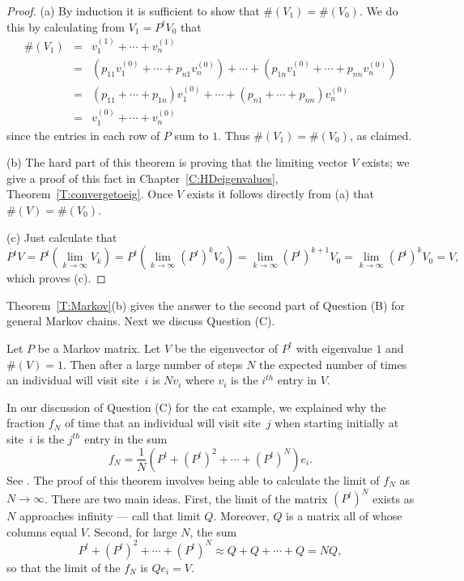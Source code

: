 \documentclass{ximera}
\begin{document}
\begin{proof}  (a) By induction it is sufficient to show that $\#(V_1)=\#(V_0)$.  We
do
this by calculating from $V_1 = P^tV_0$ that
\begin{eqnarray*}
\#(V_1) & = & v_1^{(1)} + \cdots + v_n^{(1)}\\
& = & (p_{11}v_1^{(0)} + \cdots + p_{n1}v_n^{(0)}) + \cdots +
	(p_{1n}v_1^{(0)} + \cdots + p_{nn}v_n^{(0)}) \\
& = & (p_{11}+ \cdots + p_{1n})v_1^{(0)}  + \cdots +
	(p_{n1} + \cdots + p_{nn})v_n^{(0)} \\
& = & v_1^{(0)}  + \cdots + v_n^{(0)}
\end{eqnarray*}
since the entries in each row of $P$ sum to $1$.  Thus $\#(V_1)=\#(V_0)$, as
claimed.

(b)	The hard part of this theorem is proving that the limiting vector $V$
exists; we give a proof of this fact in Chapter~\ref{C:HDeigenvalues},
Theorem~\ref{T:convergetoeig}.  Once $V$ exists it follows directly from (a)
that $\#(V)=\#(V_0)$.

(c)   	Just calculate that
\[
P^tV = P^t(\lim_{k\to\infty}V_k) = P^t(\lim_{k\to\infty}(P^t)^kV_0)
= \lim_{k\to\infty}(P^t)^{k+1}V_0 = \lim_{k\to\infty}(P^t)^kV_0 = V,
\]
which proves (c).   \end{proof}

Theorem~\ref{T:Markov}(b) gives the answer to the second part of Question (B)
for general Markov chains.  Next we discuss Question (C).

\begin{thm} \label{T:ergodic}
Let $P$ be a Markov matrix.
Let $V$ be the eigenvector of $P^t$ with
eigenvalue $1$ and $\#(V)=1$.  Then after a large number of steps $N$ the
expected number of times an individual will visit site~$i$ is $Nv_i$ where
$v_i$ is the $i^{th}$ entry in $V$.
\end{thm}

  In our discussion of Question (C) for the
cat example, we explained why the fraction $f_N$ of time that an individual
will visit site~$j$ when starting initially at site~$i$ is the $j^{th}$ entry
in the sum
\[
f_N = \frac{1}{N}(P^t + (P^t)^2 + \cdots + (P^t)^N)e_i.
\]
See .  The proof of this theorem involves being able to calculate
the limit of $f_N$ as $N\to\infty$.  There are two main ideas.  First, the
limit of the matrix $(P^t)^N$ exists as $N$ approaches infinity --- call that
limit $Q$.  Moreover, $Q$ is a matrix all of whose columns equal $V$.
Second, for large $N$, the sum
\[
P^t + (P^t)^2 + \cdots + (P^t)^N \approx Q + Q + \cdots + Q = NQ,
\]
so that the limit of the $f_N$ is $Qe_i=V$.
\end{document}
